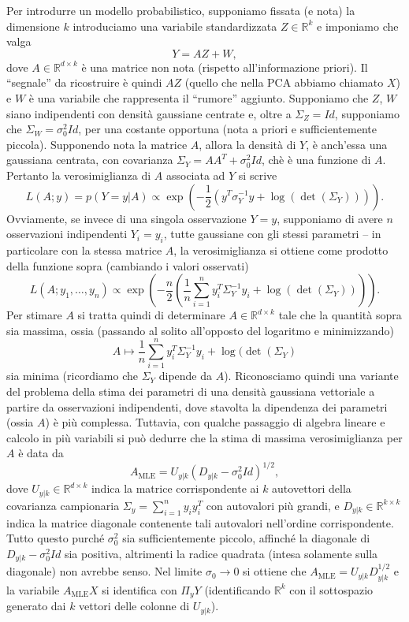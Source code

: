 \documentclass[
  italian,
  letterpaper,
]{book}
\newcommand{\bra}[1]{\left( #1 \right)}
\newcommand{\R}{\mathbb{R}}
\newcommand{\mle}{\operatorname{MLE}}
\theoremstyle{definition}
\theoremstyle{remark}
\begin{document}
Per introdurre un modello probabilistico, supponiamo fissata (e nota) la
dimensione \(k\) introduciamo una variabile standardizzata
\(Z \in \R^k\) e imponiamo che valga \[Y = AZ+W,\] dove
\(A \in \R^{d \times k}\) è una matrice non nota (rispetto
all'informazione priori). Il ``segnale'' da ricostruire è quindi \(AZ\)
(quello che nella PCA abbiamo chiamato \(X\)) e \(W\) è una variabile
che rappresenta il ``rumore'' aggiunto. Supponiamo che \(Z\), \(W\)
siano indipendenti con densità gaussiane centrate e, oltre a
\(\Sigma_Z = Id\), supponiamo che \(\Sigma_W = \sigma_0^2 Id\), per una
costante opportuna (nota a priori e sufficientemente piccola).
Supponendo nota la matrice \(A\), allora la densità di \(Y\), è
anch'essa una gaussiana centrata, con covarianza
\(\Sigma_Y =  AA^T + \sigma_0^2 Id\), chè è una funzione di \(A\).
Pertanto la verosimiglianza di \(A\) associata ad \(Y\) si scrive
\[L(A; y)  = p(Y=y | A) \propto \exp\bra{ - \frac 1 2 \bra{ y^T \sigma_Y^{-1} y + \log(\det(\Sigma_Y))  }}.\]
Ovviamente, se invece di una singola osservazione \(Y=y\), supponiamo di
avere \(n\) osservazioni indipendenti \(Y_i= y_i\), tutte gaussiane con
gli stessi parametri -- in particolare con la stessa matrice \(A\), la
verosimiglianza si ottiene come prodotto della funzione sopra (cambiando
i valori osservati)
\[ L(A; y_1, \ldots, y_n)  \propto \exp\bra{ - \frac n {2} \bra{ \frac 1 n\sum_{i=1}^n y_i^T \Sigma_Y^{-1} y_i + \log(\det(\Sigma_Y))  }}.\]
Per stimare \(A\) si tratta quindi di determinare
\(A \in \R^{d \times k}\) tale che la quantità sopra sia massima, ossia
(passando al solito all'opposto del logaritmo e minimizzando)
\[ A \mapsto \frac 1 n\sum_{i=1}^n y_i ^T \Sigma_Y^{-1} y_i + \log(\det(\Sigma_Y)\]
sia minima (ricordiamo che \(\Sigma_Y\) dipende da \(A\)). Riconosciamo
quindi una variante del problema della stima dei parametri di una
densità gaussiana vettoriale a partire da osservazioni indipendenti,
dove stavolta la dipendenza dei parametri (ossia \(A\)) è più complessa.
Tuttavia, con qualche passaggio di algebra lineare e calcolo in più
variabili si può dedurre che la stima di massima verosimiglianza per
\(A\) è data da
\[ A_{{\mle}} =  U_{y|k} (D_{y|k} - \sigma^2_0Id)^{1/2},\] dove
\(U_{y|k} \in \R^{d \times k}\) indica la matrice corrispondente ai
\(k\) autovettori della covarianza campionaria
\(\Sigma_y = \sum_{i=1}^n y_i y_i^T\) con autovalori più grandi, e
\(D_{y|k} \in \R^{k\times k}\) indica la matrice diagonale contenente
tali autovalori nell'ordine corrispondente. Tutto questo purché
\(\sigma_0^2\) sia sufficientemente piccolo, affinché la diagonale di
\(D_{y|k} - \sigma^2_0 Id\) sia positiva, altrimenti la radice quadrata
(intesa solamente sulla diagonale) non avrebbe senso. Nel limite
\(\sigma_0 \to 0\) si ottiene che \(A_{{\mle}}= U_{y|k} D_{y|k}^{1/2}\)
e la variabile \(A_{{\mle}}X\) si identifica con \(\Pi_y Y\)
(identificando \(\R^k\) con il sottospazio generato dai \(k\) vettori
delle colonne di \(U_{y|k}\)).
\end{document}
